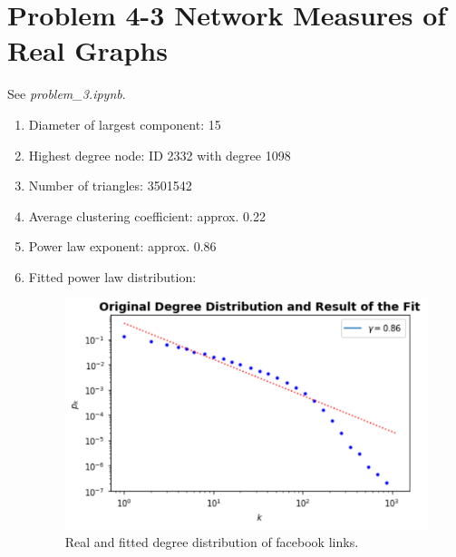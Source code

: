 \section{Problem 4-3 Network Measures of Real Graphs}

See \textit{problem\_3.ipynb}.

\begin{enumerate}
	\item Diameter of largest component: 15
	\item Highest degree node: ID 2332 with degree 1098
	\item Number of triangles: 3501542
	\item Average clustering coefficient: approx. 0.22
	\item Power law exponent: approx. 0.86
	\item Fitted power law distribution:
	
	\begin{figure}[h]
		\centering
		\includegraphics[width=0.9\linewidth]{images/problem43_degree_distribution.png}
		\caption{Real and fitted degree distribution of facebook links.}
		\label{distribution}
	\end{figure}
\end{enumerate}
